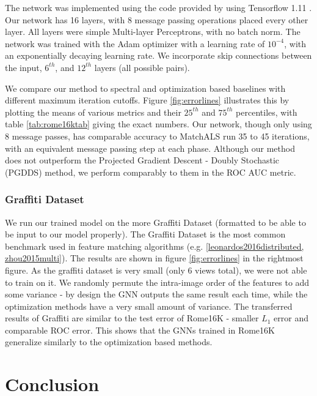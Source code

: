 \documentclass{article} %
\begin{document}
The network was implemented using the code provided by \cite{battaglia2018relational} using Tensorflow 1.11 \citep{tensorflow2015}.
Our network has 16 layers, with 8 message passing operations placed every other layer.
All layers were simple Multi-layer Perceptrons, with no batch norm.
The network was trained with the Adam optimizer \citep{kingma2014adam} with a learning rate of $10^{-4}$, with an exponentially decaying learning rate.
We incorporate skip connections between the input, $6^{th}$, and $12^{th}$ layers (all possible pairs).

We compare our method to spectral and optimization based baselines with different maximum iteration cutoffs.
Figure \ref{fig:errorlines} illustrates this by plotting the means of various metrics and their $25^{th}$ and $75^{th}$ percentiles, with table \ref{tab:rome16ktab} giving the exact numbers.
Our network, though only using 8 message passes, has comparable accuracy to MatchALS \citep{zhou2015multi} run 35 to 45 iterations, with an equivalent message passing step at each phase.
Although our method does not outperform the Projected Gradient Descent - Doubly Stochastic (PGDDS) \citep{leonardos2016distributed} method, we perform comparably to them in the ROC AUC metric.

\subsubsection{Graffiti Dataset} \label{sec:graffiti}
We run our trained model on the more Graffiti Dataset (formatted to be able to be input to our model properly).
The Graffiti Dataset is the most common benchmark used in feature matching algorithms (e.g. \ref{leonardos2016distributed, zhou2015multi}).
The results are shown in figure \ref{fig:errorlines} in the rightmost figure.
As the graffiti dataset is very small (only 6 views total), we were not able to train on it.
We randomly permute the intra-image order of the features to add some variance - by design the GNN outputs the same result each time, while the optimization methods have a very small amount of variance.
The transferred results of Graffiti are similar to the test error of Rome16K - smaller $L_1$ error and comparable ROC error.
This shows that the GNNs trained in Rome16K generalize similarly to the optimization based methods.

\section{Conclusion}
\end{document}
